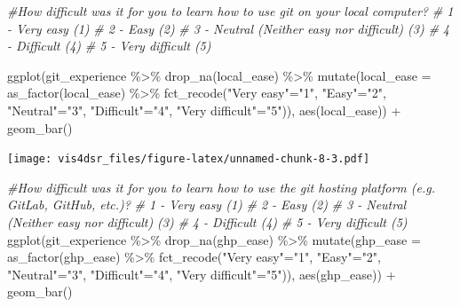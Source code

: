 \documentclass[
]{krantz}
\makeatletter
\newenvironment{Shaded}{\begin{snugshade}}{\end{snugshade}}
\newcommand{\AttributeTok}[1]{\textcolor[rgb]{0.61,0.61,0.61}{#1}}
\newcommand{\CommentTok}[1]{\textcolor[rgb]{0.37,0.37,0.37}{\textit{#1}}}
\newcommand{\FunctionTok}[1]{\textcolor[rgb]{0,0,0}{#1}}
\newcommand{\NormalTok}[1]{#1}
\newcommand{\OtherTok}[1]{\textcolor[rgb]{0.37,0.37,0.37}{#1}}
\newcommand{\SpecialCharTok}[1]{\textcolor[rgb]{0,0,0}{#1}}
\newcommand{\StringTok}[1]{\textcolor[rgb]{0.5,0.5,0.5}{#1}}
\newenvironment{kframe}{%
\medskip{}
\setlength{\fboxsep}{.8em}
 \def\at@end@of@kframe{}%
 \ifinner\ifhmode%
  \def\at@end@of@kframe{\end{minipage}}%
  \begin{minipage}{\columnwidth}%
 \fi\fi%
 \def\FrameCommand##1{\hskip\@totalleftmargin \hskip-\fboxsep
 \colorbox{shadecolor}{##1}\hskip-\fboxsep
     \hskip-\linewidth \hskip-\@totalleftmargin \hskip\columnwidth}%
 \MakeFramed {\advance\hsize-\width
   \@totalleftmargin\z@ \linewidth\hsize
   \@setminipage}}%
 {\par\unskip\endMakeFramed%
 \at@end@of@kframe}
\renewenvironment{Shaded}{\begin{kframe}}{\end{kframe}}
\makeatother
\begin{document}
\begin{Shaded}
\begin{Highlighting}[]
\CommentTok{\#How difficult was it for you to learn how to use git on your local computer?}
\CommentTok{\# 1 {-} Very easy (1)}
\CommentTok{\# 2 {-} Easy (2)}
\CommentTok{\# 3 {-} Neutral (Neither easy nor difficult) (3)}
\CommentTok{\# 4 {-} Difficult (4)}
\CommentTok{\# 5 {-} Very difficult (5)}

\FunctionTok{ggplot}\NormalTok{(git\_experience }\SpecialCharTok{\%\textgreater{}\%} 
         \FunctionTok{drop\_na}\NormalTok{(local\_ease) }\SpecialCharTok{\%\textgreater{}\%}
         \FunctionTok{mutate}\NormalTok{(}\AttributeTok{local\_ease =} \FunctionTok{as\_factor}\NormalTok{(local\_ease) }\SpecialCharTok{\%\textgreater{}\%} 
             \FunctionTok{fct\_recode}\NormalTok{(}\StringTok{"Very easy"}\OtherTok{=}\StringTok{"1"}\NormalTok{, }
                        \StringTok{"Easy"}\OtherTok{=}\StringTok{"2"}\NormalTok{, }\StringTok{"Neutral"}\OtherTok{=}\StringTok{"3"}\NormalTok{, }
                        \StringTok{"Difficult"}\OtherTok{=}\StringTok{"4"}\NormalTok{, }\StringTok{"Very difficult"}\OtherTok{=}\StringTok{"5"}\NormalTok{)), }
       \FunctionTok{aes}\NormalTok{(local\_ease)) }\SpecialCharTok{+}
  \FunctionTok{geom\_bar}\NormalTok{()}
\end{Highlighting}
\end{Shaded}

\texttt{[image: vis4dsr\_files/figure-latex/unnamed-chunk-8-3.pdf]}

\begin{Shaded}
\begin{Highlighting}[]
\CommentTok{\#How difficult was it for you to learn how to use the git hosting platform (e.g. GitLab, GitHub, etc.)?}
\CommentTok{\# 1 {-} Very easy (1)}
\CommentTok{\# 2 {-} Easy (2)}
\CommentTok{\# 3 {-} Neutral (Neither easy nor difficult) (3)}
\CommentTok{\# 4 {-} Difficult (4)}
\CommentTok{\# 5 {-} Very difficult (5)}
\FunctionTok{ggplot}\NormalTok{(git\_experience }\SpecialCharTok{\%\textgreater{}\%} 
         \FunctionTok{drop\_na}\NormalTok{(ghp\_ease) }\SpecialCharTok{\%\textgreater{}\%}
         \FunctionTok{mutate}\NormalTok{(}\AttributeTok{ghp\_ease =} \FunctionTok{as\_factor}\NormalTok{(ghp\_ease) }\SpecialCharTok{\%\textgreater{}\%} 
             \FunctionTok{fct\_recode}\NormalTok{(}\StringTok{"Very easy"}\OtherTok{=}\StringTok{"1"}\NormalTok{, }
                        \StringTok{"Easy"}\OtherTok{=}\StringTok{"2"}\NormalTok{, }\StringTok{"Neutral"}\OtherTok{=}\StringTok{"3"}\NormalTok{, }
                        \StringTok{"Difficult"}\OtherTok{=}\StringTok{"4"}\NormalTok{, }\StringTok{"Very difficult"}\OtherTok{=}\StringTok{"5"}\NormalTok{)), }
       \FunctionTok{aes}\NormalTok{(ghp\_ease)) }\SpecialCharTok{+}
  \FunctionTok{geom\_bar}\NormalTok{()}
\end{Highlighting}
\end{Shaded}
\end{document}

